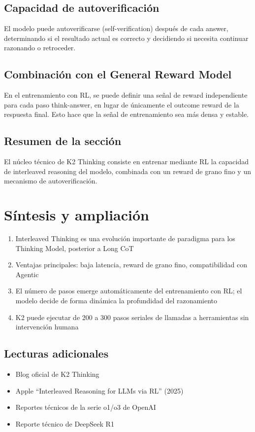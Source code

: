 \documentclass[a4paper]{article}
\begin{document}
\subsection{Capacidad de autoverificación}

El modelo puede autoverificarse (self-verification) después de cada answer, determinando si el resultado actual es correcto y decidiendo si necesita continuar razonando o retroceder.

\subsection{Combinación con el General Reward Model}

En el entrenamiento con RL, se puede definir una señal de reward independiente para cada paso think-answer, en lugar de únicamente el outcome reward de la respuesta final. Esto hace que la señal de entrenamiento sea más densa y estable.

\subsection{Resumen de la sección}

El núcleo técnico de K2 Thinking consiste en entrenar mediante RL la capacidad de interleaved reasoning del modelo, combinada con un reward de grano fino y un mecanismo de autoverificación.
\section{Síntesis y ampliación}

\begin{enumerate}
  \item Interleaved Thinking es una evolución importante de paradigma para los Thinking Model, posterior a Long CoT
  \item Ventajas principales: baja latencia, reward de grano fino, compatibilidad con Agentic
  \item El número de pasos emerge automáticamente del entrenamiento con RL; el modelo decide de forma dinámica la profundidad del razonamiento
  \item K2 puede ejecutar de 200 a 300 pasos seriales de llamadas a herramientas sin intervención humana
\end{enumerate}

\subsection{Lecturas adicionales}

\begin{itemize}
  \item Blog oficial de K2 Thinking
  \item Apple ``Interleaved Reasoning for LLMs via RL'' (2025)
  \item Reportes técnicos de la serie o1/o3 de OpenAI
  \item Reporte técnico de DeepSeek R1
\end{itemize}
\end{document}
